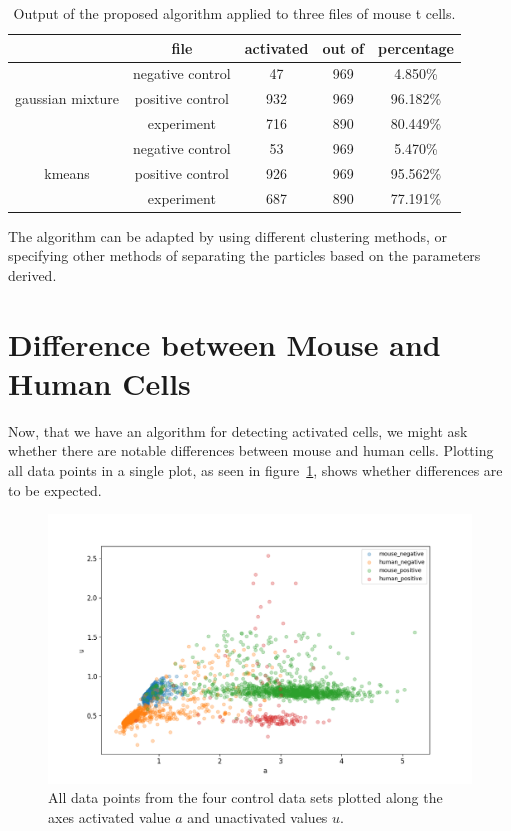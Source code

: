 \begin{table}[h]
	\centering
	\begin{tabular}{|c|c|c|c|c|}
		\hline
		 & file & activated & out of & percentage\\
		 \hline
		  & negative control & 47 & 969 & 4.850\%\\
		 gaussian mixture & positive control & 932 & 969 & 96.182\%\\
		  & experiment & 716 & 890 & 80.449\%\\
		 \hline
		  & negative control & 53 & 969 & 5.470\%\\
		 kmeans & positive control & 926 & 969 & 95.562\%\\
		  & experiment & 687 & 890 & 77.191\%\\
		 \hline
	\end{tabular}
	\caption{Output of the proposed algorithm applied to three files of mouse t cells.}
	\label{tab:results_main_algorithm}
\end{table}

The algorithm can be adapted by using different clustering methods, or specifying other methods of separating the particles based on the parameters derived.

\section{Difference between Mouse and Human Cells}
\label{sec:differences_between_mouse_and_human_cells}

Now, that we have an algorithm for detecting activated cells, we might ask whether there are notable differences between mouse and human cells. Plotting all data points in a single plot, as seen in figure~\ref{fig:all_cells}, shows whether differences are to be expected.

\begin{figure}[h]
	\centering
	\includegraphics[width=\textwidth]{fig/all_cells}
	
	\caption{All data points from the four control data sets plotted along the axes activated value $a$ and unactivated values $u$.}
	\label{fig:all_cells}
\end{figure}

